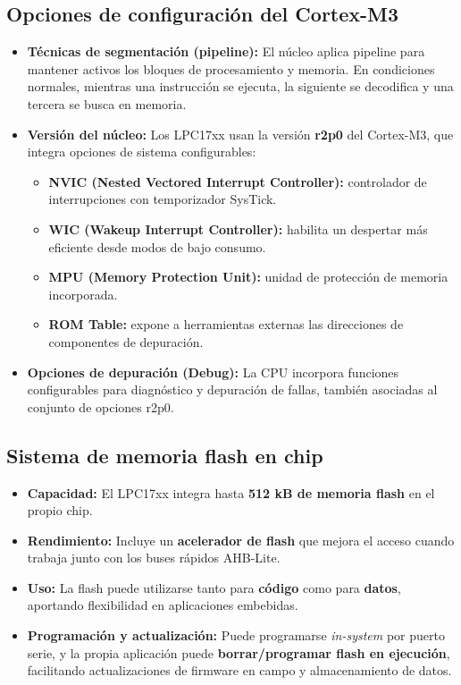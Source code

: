 ﻿\documentclass[11pt]{article}
\begin{document}
\subsection{Opciones de configuración del Cortex-M3}
\begin{itemize}
  \item \textbf{Técnicas de segmentación (pipeline):} El núcleo aplica pipeline para mantener activos los bloques de procesamiento y memoria. En condiciones normales, mientras una instrucción se ejecuta, la siguiente se decodifica y una tercera se busca en memoria.

  \item \textbf{Versión del núcleo:} Los LPC17xx usan la versión \textbf{r2p0} del Cortex-M3, que integra opciones de sistema configurables:
  \begin{itemize}
    \item \textbf{NVIC (Nested Vectored Interrupt Controller):} controlador de interrupciones con temporizador SysTick.
    \item \textbf{WIC (Wakeup Interrupt Controller):} habilita un despertar más eficiente desde modos de bajo consumo.
    \item \textbf{MPU (Memory Protection Unit):} unidad de protección de memoria incorporada.
    \item \textbf{ROM Table:} expone a herramientas externas las direcciones de componentes de depuración.
  \end{itemize}

  \item \textbf{Opciones de depuración (Debug):} La CPU incorpora funciones configurables para diagnóstico y depuración de fallas, también asociadas al conjunto de opciones r2p0.
\end{itemize}

\subsection{Sistema de memoria flash en chip}
\begin{itemize}
  \item \textbf{Capacidad:} El LPC17xx integra hasta \textbf{512 kB de memoria flash} en el propio chip.
  \item \textbf{Rendimiento:} Incluye un \textbf{acelerador de flash} que mejora el acceso cuando trabaja junto con los buses rápidos AHB-Lite.
  \item \textbf{Uso:} La flash puede utilizarse tanto para \textbf{código} como para \textbf{datos}, aportando flexibilidad en aplicaciones embebidas.
  \item \textbf{Programación y actualización:} Puede programarse \textit{in-system} por puerto serie, y la propia aplicación puede \textbf{borrar/programar flash en ejecución}, facilitando actualizaciones de firmware en campo y almacenamiento de datos.
\end{itemize}
\end{document}
